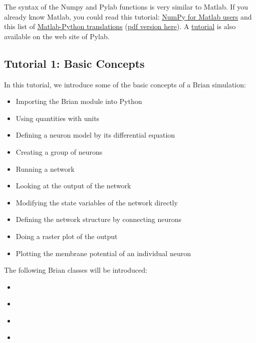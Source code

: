 \documentclass[letterpaper,10pt,english]{manual}
\begin{document}
The syntax of the Numpy and Pylab functions is very similar to Matlab.
If you already know Matlab, you could read this tutorial:
\href{http://scipy.org/NumPy\_for\_Matlab\_Users}{NumPy for Matlab users}
and this list of \href{http://mathesaurus.sourceforge.net/}{Matlab-Python translations}
(\href{http://brian.di.ens.fr/matlab-python-xref.pdf}{pdf version here}).
A \href{http://matplotlib.sourceforge.net/users/pyplot\_tutorial.html}{tutorial} is also available on
the web site of Pylab.

\resetcurrentobjects
\hypertarget{--doc-tutorial1_basic_concepts}{}

\hypertarget{tutorial1-basic-concepts}{}\subsection{Tutorial 1: Basic Concepts}

In this tutorial, we introduce some of the basic concepts of a Brian simulation:
\begin{itemize}
\item {} 
Importing the Brian module into Python

\item {} 
Using quantities with units

\item {} 
Defining a neuron model by its differential equation

\item {} 
Creating a group of neurons

\item {} 
Running a network

\item {} 
Looking at the output of the network

\item {} 
Modifying the state variables of the network directly

\item {} 
Defining the network structure by connecting neurons

\item {} 
Doing a raster plot of the output

\item {} 
Plotting the membrane potential of an individual neuron

\end{itemize}

The following Brian classes will be introduced:
\begin{itemize}
\item {} 
\hyperlink{brian.NeuronGroup}{}

\item {} 
\hyperlink{brian.Connection}{}

\item {} 
\hyperlink{brian.SpikeMonitor}{}

\item {} 
\hyperlink{brian.StateMonitor}{}

\end{itemize}
\end{document}
